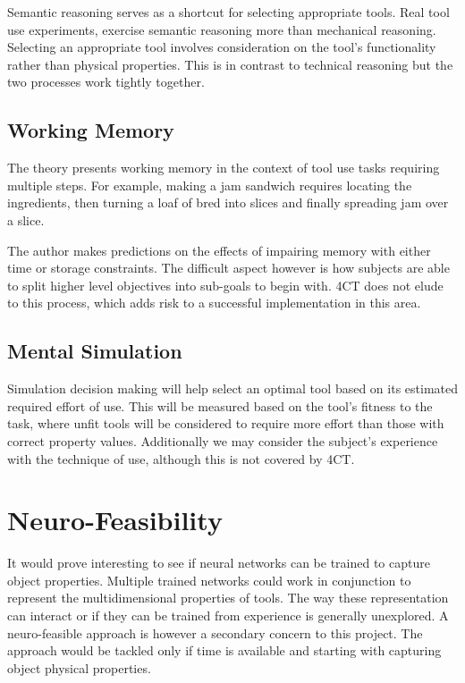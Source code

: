 \documentclass[11]{article}
\begin{document}
Semantic reasoning serves as a shortcut for selecting appropriate tools. Real tool use experiments, exercise semantic reasoning more than mechanical reasoning. Selecting an appropriate tool involves consideration on the tool's functionality rather than physical properties. This is in contrast to technical reasoning but the two processes work tightly together. 


\subsection{Working Memory}

The theory presents working memory in the context of tool use tasks requiring multiple steps. For example, making a jam sandwich requires locating the ingredients, then turning a loaf of bred into slices and finally spreading jam over a slice\cite{osiurak2014}. 

The author makes predictions on the effects of impairing memory with either time or storage constraints\cite{osiurak2014}. The difficult aspect however is how subjects are able to split higher level objectives into sub-goals to begin with. 4CT does not elude to this process, which adds risk to a successful implementation in this area. 

\subsection{Mental Simulation}

Simulation decision making will help select an optimal tool based on its estimated required effort of use. This will be measured based on the tool's fitness to the task, where unfit tools will be considered to require more effort than those with correct property values. Additionally we may consider the subject's experience with the technique of use, although this is not covered by 4CT.

\section{Neuro-Feasibility}
It would prove interesting to see if neural networks can be trained to capture object properties. Multiple trained networks could work in conjunction to represent the multidimensional properties of tools. The way these representation can interact or if they can be trained from experience is generally unexplored. A neuro-feasible approach is however a secondary concern to this project. The approach would be tackled only if time is available and starting with capturing object physical properties. 
\end{document}
